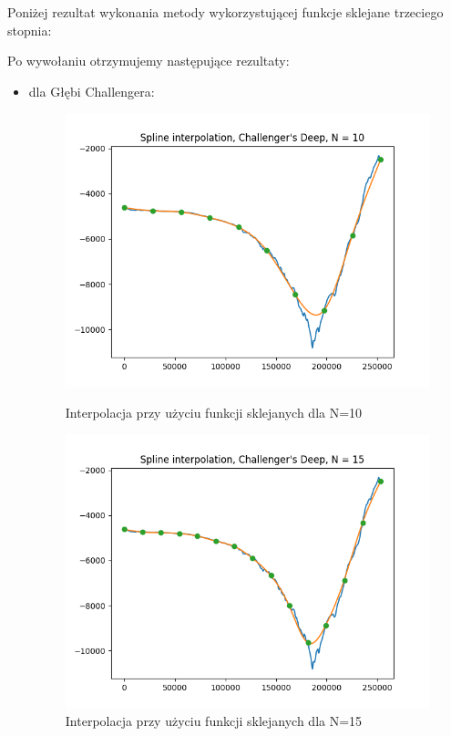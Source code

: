 \documentclass{article}
\begin{document}
Poniżej rezultat wykonania metody wykorzystującej funkcje sklejane trzeciego stopnia:

Po wywołaniu otrzymujemy następujące rezultaty:
\begin{itemize}
    
    \item dla Głębi Challengera:
    \begin{figure}[!htb]
      \includegraphics[width=\linewidth]{Challenger's_Deep_splines_N_10.png}
      \caption{Interpolacja przy użyciu funkcji sklejanych dla N=10}
    \endminipage\hfill
      \includegraphics[width=\linewidth]{Challenger's_Deep_splines_N_15.png}
      \caption{Interpolacja przy użyciu funkcji sklejanych dla N=15}

\end{figure}
\end{itemize}
\end{document}
